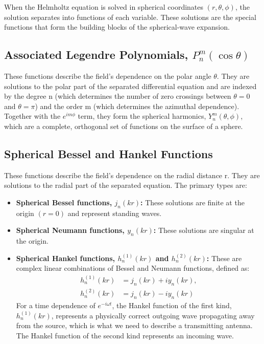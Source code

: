 \documentclass[11pt,a4paper]{article}
\begin{document}
When the Helmholtz equation is solved in spherical coordinates \((r, \theta, \phi)\), the solution separates into functions of each variable. These solutions are the special functions that form the building blocks of the spherical-wave expansion.

\subsection{Associated Legendre Polynomials, \(P_{n}^{m}(\cos\theta)\)}

These functions describe the field's dependence on the polar angle \(\theta\). They are solutions to the polar part of the separated differential equation and are indexed by the degree n (which determines the number of zero crossings between \(\theta=0\) and \(\theta=\pi\)) and the order m (which determines the azimuthal dependence). Together with the \(e^{im\phi}\) term, they form the spherical harmonics, \(Y_{n}^{m}(\theta,\phi)\), which are a complete, orthogonal set of functions on the surface of a sphere.

\subsection{Spherical Bessel and Hankel Functions}

These functions describe the field's dependence on the radial distance r. They are solutions to the radial part of the separated equation. The primary types are:
\begin{itemize}
    \item \textbf{Spherical Bessel functions, \(j_{n}(kr)\):} These solutions are finite at the origin \((r=0)\) and represent standing waves.
    \item \textbf{Spherical Neumann functions, \(y_{n}(kr)\):} These solutions are singular at the origin.
    \item \textbf{Spherical Hankel functions, \(h_{n}^{(1)}(kr)\) and \(h_{n}^{(2)}(kr)\):} These are complex linear combinations of Bessel and Neumann functions, defined as:
    \begin{align}
        h_{n}^{(1)}(kr) &= j_{n}(kr)+iy_{n}(kr), \\
        h_{n}^{(2)}(kr) &= j_{n}(kr)-iy_{n}(kr)
    \end{align}
    For a time dependence of \(e^{-i\omega t}\), the Hankel function of the first kind, \(h_{n}^{(1)}(kr)\), represents a physically correct outgoing wave propagating away from the source, which is what we need to describe a transmitting antenna. The Hankel function of the second kind represents an incoming wave.
\end{itemize}
\end{document}
